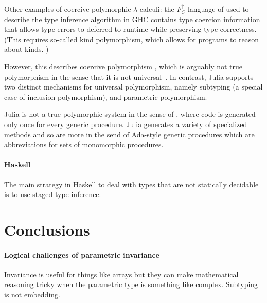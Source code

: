 \documentclass[pldi]{sigplanconf-pldi15}
\begin{document}
Other examples of coercive polymorphic $\lambda$-calculi: the $F^\uparrow_C$
language of \cite{Vytiniotis2012,Yorgey2012} used to describe the type
inference algorithm in GHC \cite{Weirich2011} contains type coercion
information that allows type errors to deferred to runtime
\cite{Vytiniotis2012} while preserving type-correctness. (This requires
so-called kind polymorphism, which allows for programs to reason about kinds.
\cite{Yorgey2012})


However, this describes coercive polymorphism \cite{Cardelli1985}, which
is arguably not true polymorphism in the sense that it is not
universal~\cite{Strachey1967,Strachey2000}. In contrast, Julia supports two
distinct mechanisms for universal polymorphism, namely subtyping (a special
case of inclusion polymorphism), and parametric polymorphism.

Julia is not a true polymorphic system in the sense of \cite{Cardelli1985},
where code is generated only once for every generic procedure. Julia generates
a variety of specialized methods and so are more in the send of Ada-style
generic procedures which are abbreviations for sets of monomorphic procedures.


\paragraph{Haskell}

The main strategy in Haskell to deal with types that are not statically
decidable is to use staged type inference.~\cite{Shields1998}


\section{Conclusions}

\paragraph{Logical challenges of parametric invariance}
Invariance is useful for things like arrays but they can make mathematical
reasoning tricky when the parametric type is something like complex.  Subtyping
is not embedding.
\end{document}
